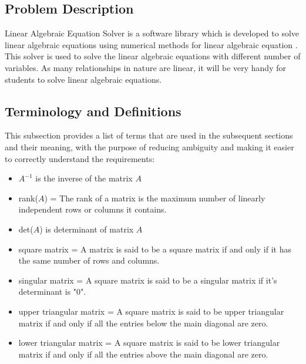 \documentclass[12pt]{article}
\newcommand{\progname}{Linear Algebraic Equation Solver} %
\begin{document}
\subsection{Problem Description} \label{Sec_pd}

\progname{} is a software library which is developed to solve linear algebraic equations using numerical methods for linear algebraic equation . This solver is used to solve the linear algebraic equations with different number of variables. As many relationships in nature are linear, it will be very handy for
students to solve linear algebraic equations.

\subsection{Terminology and  Definitions}

This subsection provides a list of terms that are used in the subsequent
sections and their meaning, with the purpose of reducing ambiguity and making it
easier to correctly understand the requirements:




\begin{itemize}


\item \textbf{$A^{-1}$} is the inverse of the matrix \textbf{$A$}

\item rank(\textbf{$A$}) = The rank of a matrix is the maximum number
of linearly independent rows or columns it contains.

\item det(\textbf{$A$}) is determinant of matrix \textbf{$A$}

\item square matrix = A matrix is said to be a square matrix if and only if it has the same number of rows and columns.

\item singular matrix = A square matrix is said to be a singular matrix if it's determinant is "0".

\item upper triangular matrix = A square matrix is said to be upper triangular matrix if and only if all the entries below the main diagonal are zero.

\item lower triangular matrix = A square matrix is said to be lower triangular matrix if and only if all the entries above the main diagonal are zero.


\end{itemize}
\end{document}
